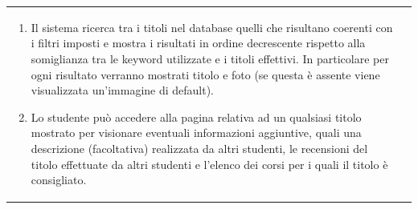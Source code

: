 \documentclass[10pt,a4paper]{report}
\begin{document}
\begin{tabular}{lp{}}
\begin{enumerate}
			\item Il sistema ricerca tra i titoli nel database quelli che risultano coerenti con i filtri imposti e mostra i risultati in ordine decrescente rispetto alla somiglianza tra le keyword utilizzate e i titoli effettivi. In particolare per ogni risultato verranno mostrati titolo e foto (se questa è assente viene visualizzata un'immagine di default).
			\item Lo studente può accedere alla pagina relativa ad un qualsiasi titolo mostrato per visionare eventuali informazioni aggiuntive, quali una descrizione (facoltativa) realizzata da altri studenti, le recensioni del titolo effettuate da altri studenti e l'elenco dei corsi per i quali il titolo è consigliato.
		\end{enumerate}
	\end{tabular}
\end{document}
